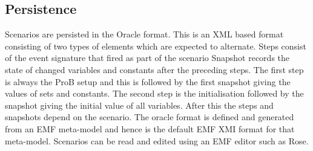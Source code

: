 \subsection{Persistence}
\label{sec:persistence}

Scenarios are persisted in the Oracle format.
This is an XML based format consisting of two types of elements which are expected to alternate.
Steps consist of the event signature that fired as part of the scenario
Snapshot records the state of changed variables and constants after the preceding steps.
The first step is always the ProB setup and this is followed by the first snapshot giving the values of sets and constants.
The second step is the initialisation followed by the snapshot giving the initial value of all variables.
After this the steps and snapshots depend on the scenario.
The oracle format is defined and generated from an EMF meta-model and hence is the default EMF XMI format for that meta-model.
Scenarios can be read and edited using an EMF editor such as Rose.


